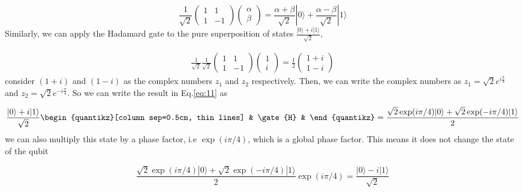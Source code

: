 \documentclass[10pt]{article}
\numberwithin{equation}{section}
\theoremstyle{defi}
\begin{document}
\begin{equation}
  \label{eq:10}
  \frac{1}{\sqrt{2}} \begin{pmatrix}
    1 & 1\\
    1 & -1
  \end{pmatrix}
  \begin{pmatrix}
    \alpha\\
    \beta
  \end{pmatrix}
  = \frac{\alpha + \beta}{\sqrt{2}}|0\rangle + \frac{\alpha - \beta}{\sqrt{2}}|1\rangle
\end{equation}
Similarly, we can apply the Hadamard gate to the pure superposition of states $\displaystyle{\frac{|0\rangle + i|1\rangle}{\sqrt{2}}}$,

\begin{align}
  \label{eq:11}
  \frac{1}{\sqrt{2}}\frac{1}{\sqrt{2}} \begin{pmatrix}
    1 & 1\\
    1 & -1
  \end{pmatrix}
  \begin{pmatrix}
    1\\
    i
  \end{pmatrix}
  =  \frac{1}{2}\begin{pmatrix}
    1 + i\\
    1 - i
  \end{pmatrix}
\end{align}
consider $(1 + i)$ and $(1 - i)$ as the complex numbers $z_1$ and $z_2$ respectively. Then, we can write the complex numbers as
$z_1 = \sqrt{2}e^{i\frac{\pi}{4}}$ and $z_2 = \sqrt{2}e^{-i\frac{\pi}{4}}$. So we can write the result in Eq.\eqref{eq:11} as 


\begin{equation}
  \label{eq:12}
  \frac{|0\rangle + i|1\rangle}{\sqrt{2}}
  \begin{quantikz}[column sep=0.5cm, thin lines]
  & \gate{H} & 
  \end{quantikz}  
   = \frac{\sqrt{2}\exp(i\pi/4)|0\rangle +\sqrt{2} \exp(-i\pi/4)|1\rangle}{2}
\end{equation}
we can also multiply this state by a phase factor, i.e $\exp(i\pi/4)$, which is a global phase factor. This means it does not change the state of the qubit

\begin{equation*}
  \frac{\sqrt{2}\exp(i\pi/4)|0\rangle +\sqrt{2} \exp(-i\pi/4)|1\rangle}{2}  \exp(i\pi/4) = \frac{|0\rangle - i|1\rangle}{\sqrt{2}} 
\end{equation*} 
\end{document}
